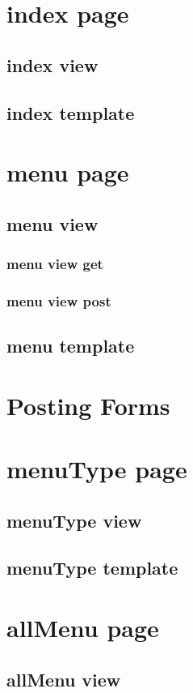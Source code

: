 \section{index page}
\subsection{index view}
\subsection{index template}

\section{menu page}
\subsection{menu view}
\subsubsection{menu view get}
\subsubsection{menu view post}
\subsection{menu template}

\section{Posting Forms}

\section{menuType page}
\subsection{menuType view}
\subsection{menuType template}

\section{allMenu page}
\subsection{allMenu view}
